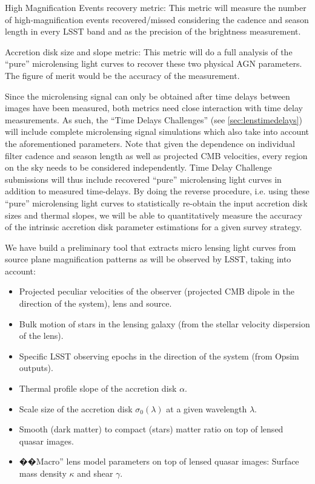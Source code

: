 High Magnification Events recovery metric: This metric will measure the
number of high-magnification events recovered/missed considering the
cadence and season length in every LSST band and as the precision of the
brightness measurement.



Accretion disk size and slope metric: This metric will do a full
analysis of the ``pure'' microlensing light curves to recover these two
physical AGN parameters. The figure of merit would be the accuracy of
the measurement.

Since the microlensing signal can only be obtained after time delays between images
have been measured, both metrics need close interaction with time delay
measurements. As such, the ``Time Delays Challenges'' (see
\autoref{sec:lenstimedelays}) will include complete microlensing signal
simulations which also take into account the aforementioned parameters. Note
that given
the dependence on individual filter cadence and season length as well as
projected CMB velocities, every region on the sky needs to be considered
independently. Time Delay Challenge submissions will thus include recovered
``pure'' microlensing
light curves in addition to measured time-delays. By doing the reverse
procedure, i.e. using these ``pure'' microlensing light curves to statistically
re-obtain the input accretion disk sizes and thermal slopes, we will be able to
quantitatively measure the accuracy of the intrinsic accretion disk parameter
estimations for a given survey strategy.



We have build a preliminary tool that extracts micro lensing light curves from source plane magnification patterns as will be observed by LSST, taking into account:
\begin{itemize}
\item Projected peculiar velocities of the observer (projected CMB dipole in the direction of the system), lens and source.
\item Bulk motion of stars in the lensing galaxy (from the stellar velocity dispersion of the lens).
\item Specific LSST observing epochs in the direction of the system (from Opsim outputs).
\item Thermal profile slope of the accretion disk $\alpha$.
\item Scale size of the accretion disk $\sigma_{0}(\lambda)$ at a given wavelength $\lambda$.
\item Smooth (dark matter) to compact (stars) matter ratio on top of lensed quasar images.
\item ��Macro'' lens model parameters on top of lensed quasar images: Surface mass density $\kappa$ and shear $\gamma$.
\end{itemize}

